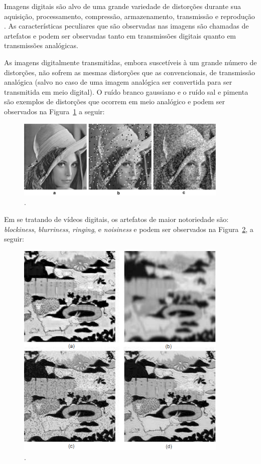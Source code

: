 Imagens digitais são alvo de uma grande variedade de distorções durante sua aquisição, processamento, compressão, armazenamento, transmissão e reprodução \cite{wangbovik2004}. As características peculiares que são observadas nas imagens são chamadas de artefatos \cite{albini} e podem ser observadas tanto em transmissões digitais quanto em transmissões analógicas.

As imagens digitalmente transmitidas, embora suscetíveis à um grande número de distorções, não sofrem as mesmas distorções que as convencionais, de transmissão analógica (salvo no caso de uma imagem analógica ser convertida para ser transmitida em meio digital). O ruído branco gaussiano e o ruído sal e pimenta são exemplos de distorções que ocorrem em meio analógico e podem ser observados na Figura~\ref{fig:artefatosanalogicos} a seguir:

\begin{figure}[!htb]
	\centering
	\includegraphics[width=0.9\textwidth]{./imgs/artefatosanalogicos.png}
	\caption{.}
	\label{fig:artefatosanalogicos}
\end{figure}

Em se tratando de vídeos digitais, os artefatos de maior notoriedade são: \emph{blockiness}, \emph{blurriness}, \emph{ringing}, e \emph{noisiness} \cite{farias2007} e podem ser observados na Figura~\ref{fig:artefatosdigitais}, a seguir:

\begin{figure}[!htb]
	\centering
	\includegraphics[width=0.9\textwidth]{./imgs/artefatosdigitais.png}
	\caption{.}
	\label{fig:artefatosdigitais}
\end{figure}

